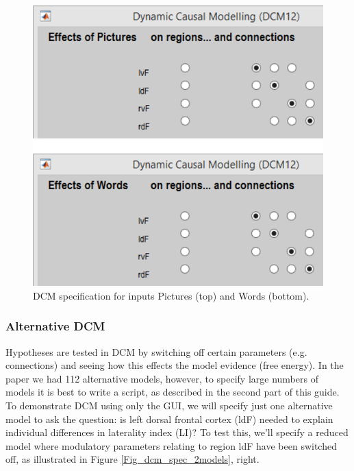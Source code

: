\documentclass{article}
\begin{document}
\begin{itemize}
\begin{figure}[ht]
\begin{center}
\includegraphics{"Fig_dcm_spec_Pictures_Words"}
\caption{DCM specification for inputs Pictures (top) and Words (bottom).\label{Fig_dcm_spec_Pictures_Words}}
\end{center}
\end{figure}

\end{itemize}

\subsubsection{Alternative DCM} \label{GUI_altDCM}
Hypotheses are tested in DCM by switching off certain parameters (e.g. connections) and seeing how this effects the model evidence (free energy). In the paper we had 112 alternative models, however, to specify large numbers of models it is best to write a script, as described in the second part of this guide. To demonstrate DCM using only the GUI, we will  specify just one alternative model to ask the question:  is left dorsal frontal cortex (ldF) needed to explain individual differences in laterality index (LI)? To test this, we'll specify a reduced model where modulatory parameters relating to region ldF have been switched off, as illustrated in Figure \ref{Fig_dcm_spec_2models}, right.
\end{document}
